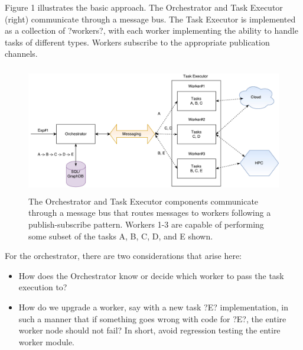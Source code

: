 \documentclass[review]{elsarticle}
\begin{document}
Figure 1 illustrates the basic approach. The Orchestrator and Task Executor (right) communicate through a message bus.  The Task Executor is implemented as a collection of ?workers?, with each worker implementing the ability to handle tasks of different types. Workers subscribe to the appropriate publication channels.

\begin{figure}
\includegraphics[height=2.2in, width=4.8 in]{figures/figure1.pdf}
\caption{The Orchestrator and Task Executor components communicate through a message bus that routes messages to workers following a publish-subscribe pattern. Workers 1-3 are capable of performing some subset of the tasks A, B, C, D, and E shown.}
\end{figure}

For the orchestrator, there are two considerations that arise here:
\begin{itemize}
\item How does the Orchestrator know or decide which worker to pass the task execution to?
\item How do we upgrade a worker, say with a new task ?E? implementation, in such a manner that if something goes wrong with code for ?E?, the entire worker node should not fail? In short, avoid regression testing the entire worker module.
\end{itemize}
\end{document}
